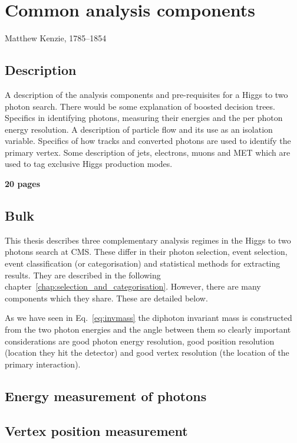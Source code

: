 \chapter{Common analysis components}
\label{chap:common_analysis_components}
{Matthew Kenzie, 1785--1854}

\section{Description}

A description of the analysis components and pre-requisites for a Higgs to two photon search. There would be some explanation of boosted decision trees. Specifics in identifying photons, measuring their energies and the per photon energy resolution. A description of particle flow and its use as an isolation variable. Specifics of how tracks and converted photons are used to identify the primary vertex. Some description of jets, electrons, muons and MET which are used to tag exclusive Higgs production modes.

\textbf{20 pages}

\section{Bulk}

This thesis describes three complementary analysis regimes in the Higgs to two photons search at CMS. These differ in their photon selection, event selection, event classification (or categorisation) and statistical methods for extracting results. They are described in the following chapter~\ref{chap:selection_and_categorisation}. However, there are many components which they share. These are detailed below.

As we have seen in Eq.~\ref{eq:invmass} the diphoton invariant mass is constructed from the two photon energies and the angle between them so clearly important considerations are good photon energy resolution, good position resolution (location they hit the detector) and good vertex resolution (the location of the primary interaction).

\section{Energy measurement of photons}

\section{Vertex position measurement}

